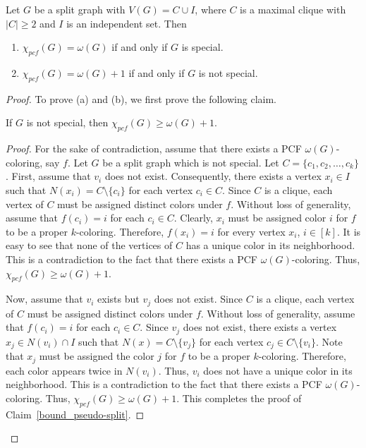 \documentclass[10pt,a4paper]{amsart}
\begin{document}
\begin{theorem}\label{split}
	Let $G$ be a split graph with $V(G) = C \cup I$, where $C$ is a maximal clique with $|C|\geq 2$ and $I$ is an independent set. Then 
	\begin{enumerate}
		\item $\chi_{pcf}(G) = \omega(G)$ if and only if $G$ is special.
		\item $\chi_{pcf}(G) = \omega(G)+1$ if and only if $G$ is not special.
	\end{enumerate}
\end{theorem}

\begin{proof}
	
	To prove (a) and (b), we first prove the following claim.
	\begin{claim}\label{bound_pseudo-split}
		If $G$ is not special, then $\chi_{pcf}(G)\geq \omega(G)+1$.
	\end{claim}
	\begin{proof}
		For the sake of contradiction, assume that there exists a PCF $\omega(G)$-coloring, say $f$.
		Let $G$ be a split graph which is not special. Let $C = \{c_1, c_2, \ldots, c_k\}$. 
		First, assume that $v_i$ does not exist. 
		Consequently, there exists a vertex $x_i\in I$ such that $N(x_i) = C\setminus\{c_i\}$ for each vertex $c_i\in C$. Since $C$ is a clique, each vertex of $C$ must be assigned distinct colors under $f$. Without loss of generality, assume that $f(c_i) = i$ for each $c_i\in C$. Clearly, $x_i$ must be assigned color $i$ for $f$ to be a proper $k$-coloring. Therefore, $f(x_i) = i$ for every vertex $x_i$, $i\in [k]$.
		It is easy to see that none of the vertices of $C$ has a unique color in its neighborhood. This is a contradiction to the fact that there exists a PCF $\omega(G)$-coloring. Thus, $\chi_{pcf}(G)\geq \omega(G)+1$.
		
		\medskip
		
		Now, assume that $v_i$ exists but $v_j$ does not exist.  Since $C$ is a clique, each vertex of $C$ must be assigned distinct colors under $f$. Without loss of generality, assume that $f(c_i) = i$ for each $c_i\in C$. 
		Since $v_j$ does not exist, there exists a vertex $x_j\in N(v_i)\cap I$ such that $N(x) = C\setminus\{v_j\}$ for each vertex $c_j\in C\setminus\{v_i\}$. Note that $x_j$ must be assigned the color $j$ for $f$ to be a proper $k$-coloring. 
		Therefore, each color appears twice in $N(v_i)$. Thus, $v_i$ does not have a unique color in its neighborhood. 
		This is a contradiction to the fact that there exists a PCF $\omega(G)$-coloring. Thus, $\chi_{pcf}(G)\geq \omega(G)+1$.
		This completes the proof of Claim~\ref{bound_pseudo-split}.
	\end{proof}
	

\end{proof}
\end{document}
